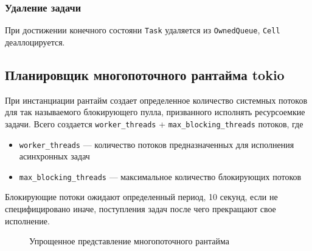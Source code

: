 \subsubsection{Удаление задачи}

При достижении конечного состояни \verb|Task| удаляется из \verb|OwnedQueue|, \verb|Cell| деаллоцируется.

\subsection{Планировщик многопоточного рантайма tokio}


При инстанциации рантайм создает определенное количество системных потоков для так называемого блокирующего пулла, призванного исполнять ресурсоемкие задачи. Всего создается \verb|worker_threads| + \verb|max_blocking_threads| потоков, где

\begin{itemize}
    \item \verb|worker_threads| --- количество потоков предназначенных для исполнения асинхронных задач
    \item \verb|max_blocking_threads| --- максимальное количество блокирующих потоков
\end{itemize}

Блокирующие потоки ожидают определенный период, 10 секунд, если не специфицировано иначе, поступления задач после чего прекращают свое исполнение.

\begin{figure}[H]
    \begin{center}
    \end{center}

    \caption{Упрощенное представление многопоточного рантайма}
    \label{fig:tokio:arch}
\end{figure}

